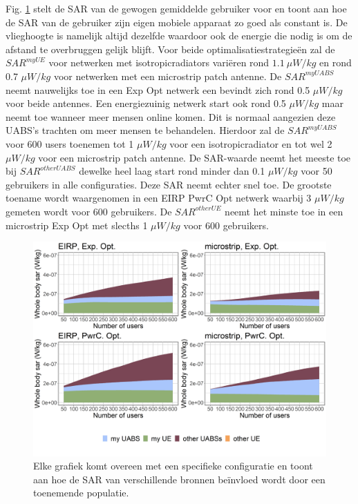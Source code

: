 \documentclass[twocolumn]{phdsymp_dutch}
\begin{document}
Fig. \ref{fig:s3b_fourSourcesMatrix} stelt de  
\gls{SAR} van de gewogen gemiddelde gebruiker voor en toont aan hoe de 
\gls{SAR} van de gebruiker zijn eigen mobiele apparaat zo goed als constant is.
De vlieghoogte is namelijk altijd dezelfde waardoor ook de energie die nodig is om de afstand te overbruggen gelijk blijft.
Voor beide optimalisatiestrategie\"en zal de
 $SAR^{myUE}$ voor netwerken met  \gls{isotropicradiator}s vari\"eren rond $1.1\ \mu W/kg$  %
 en rond 0.7 $\mu W/kg$ voor netwerken met een microstrip patch antenne.
De $SAR^{myUABS}$ neemt nauwelijks toe in een \gls{Exp Opt} netwerk een bevindt zich rond 0.5 $\mu W/kg$ voor beide antennes.
Een energiezuinig netwerk start ook rond
 0.5 $\mu W/kg$ maar neemt toe wanneer meer mensen online komen.
Dit is normaal aangezien deze \gls{UABS}'s trachten om meer mensen te behandelen.
Hierdoor zal de $SAR^{myUABS}$ 
voor 600 users toenemen tot 1 $\mu W/kg$ voor een \gls{isotropicradiator} en tot wel 2 $\mu W/kg$ voor een microstrip patch antenne.
De \gls{SAR}-waarde neemt het meeste toe bij $SAR^{otherUABS}$ dewelke heel laag start rond minder  dan  
0.1 $\mu W/kg$ voor 50 gebruikers in alle configuraties. 
Deze \gls{SAR} neemt echter snel toe. De grootste toename wordt waargenomen in een 
\gls{EIRP} \gls{PwrC Opt} netwerk 
waarbij 3 $\mu W/kg$ gemeten wordt voor 600 gebruikers. De $SAR^{otherUE}$ neemt het minste toe in een microstrip \gls{Exp Opt} met 
slecths 1 $\mu W/kg$ voor 600 gebruikers.
\begin{figure}[h!]
\centering
  \includegraphics[width=0.9\linewidth]{../results/s3/uFourSources.png}
  \caption{Elke grafiek komt overeen met een specifieke configuratie en toont aan hoe de \acs{SAR} 
  van verschillende bronnen be\"invloed wordt door een toenemende populatie. %
}
  \label{fig:s3b_fourSourcesMatrix}
\end{figure}
\end{document}

